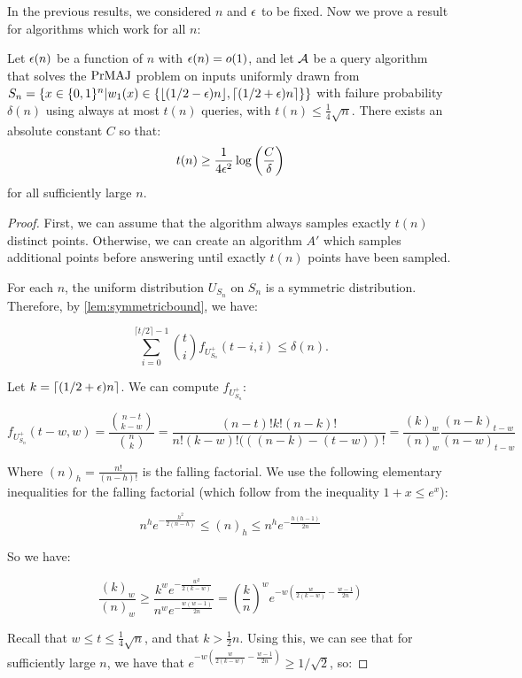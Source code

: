 In the previous results, we considered $n$ and $\epsilon$ to be fixed. Now 
we prove a result for algorithms which work for all $n$:

\begin{theorem}
\label{thm:querylb}
Let $\epsilon(n)$ be a function of $n$ with $\epsilon(n) = o(1)$, and
let $\mathcal{A}$ be a query algorithm that solves the $\mathrm{PrMAJ}$ problem on inputs uniformly drawn from 
$S_n = \{x \in \{0, 1\}^n | w_1(x) \in \{\lfloor(1/2-\epsilon)n\rfloor, \lceil(1/2+\epsilon)n\rceil\}\}$ 
with failure probability $\delta(n)$ using always at most $t(n)$ queries, with $t(n) \leq \frac{1}{4}\sqrt{n}$. 
There exists an absolute constant $C$ so that: 
$$
t(n) \geq \frac{1}{4\epsilon^2} \log \left(\frac{C}{\delta}\right)
$$
for all sufficiently large $n$.
\end{theorem}

\begin{proof}

First, we can assume that the algorithm always samples exactly $t(n)$ distinct points. Otherwise,
we can create an algorithm $A'$ which samples additional points before answering
until exactly $t(n)$ points have been sampled.

For each $n$, the uniform distribution $U_{S_n}$ on $S_n$ is a symmetric distribution. 
Therefore, by \cref{lem:symmetricbound}, we have:

$$
\sum_{i=0}^{\lceil t/2 \rceil-1} \binom{t}{i} f_{U^+_{S_n}}(t-i, i) \leq \delta(n).
$$

Let $k = \lceil(1/2+\epsilon)n\rceil$. We can compute $f_{U^+_{S_n}}$:


\begin{equation}
\label{eq:fcalc}
f_{U^+_{S_n}}(t-w, w) = \frac{\binom{n-t}{k-w}}{\binom{n}{k}} = \frac{(n-t)!k!(n-k)!}{n!(k-w)!(((n-k)-(t-w))!}
    = \frac{(k)_w}{(n)_w} \frac{(n-k)_{t-w}}{(n-w)_{t-w}}
\end{equation}

Where $(n)_h = \frac{n!}{(n-h)!}$ is the falling factorial. We use the following elementary inequalities 
for the falling factorial (which follow from the inequality $1+x \leq e^x$):

$$
n^h e^{-\frac{h^2}{2(n-h)}} \leq (n)_h \leq n^h e^{-\frac{h(h-1)}{2n}}
$$

So we have:

$$
\frac{(k)_w}{(n)_w} \geq \frac{k^we^{-\frac{w^2}{2(k-w)}}}{n^we^{-\frac{w(w-1)}{2n}}} = \left(\frac{k}{n}\right)^w e^{-w\left(\frac{w}{2(k-w)}-\frac{w-1}{2n}\right)}
$$

Recall that $w \leq t \leq \frac{1}{4}\sqrt{n}$, and that $k > \frac{1}{2}n$. Using this, we can see that for sufficiently large $n$, we have that $e^{-w\left(\frac{w}{2(k-w)}-\frac{w-1}{2n}\right)} \geq 1/\sqrt{2}$, so:


\end{proof}

